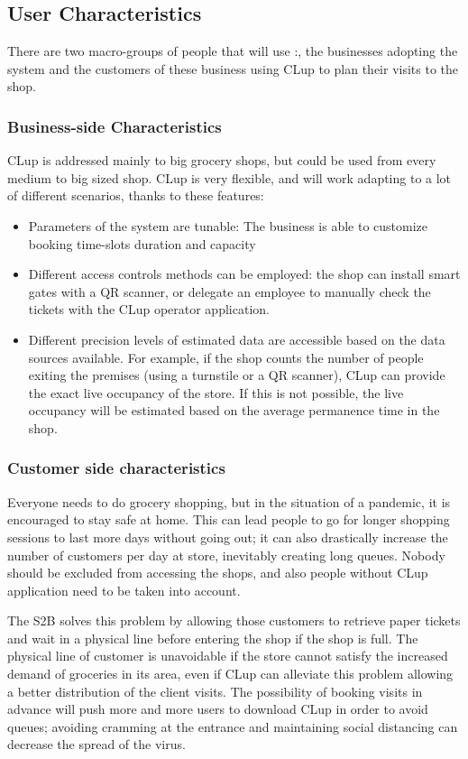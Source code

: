 \subsection{User Characteristics}
There are two macro-groups of people that will use :, the businesses adopting the system and the customers of these business using CLup to plan their visits to the shop.

\subsubsection{Business-side Characteristics}
CLup is addressed mainly to big grocery shops, but could be used from every medium to big sized shop.
CLup is very flexible, and will work adapting to a lot of different scenarios, thanks to these features:
\begin{itemize}
    \item Parameters of the system are tunable: The business is able to customize booking time-slots duration and capacity
    \item Different access controls methods can be employed: the shop can install smart gates with a QR scanner, or delegate an employee to manually check the tickets with the CLup operator application.
    \item Different precision levels of estimated data are accessible based on the data sources available. For example, if the shop counts the number of people exiting the premises (using a turnstile or a QR scanner), CLup can provide the exact live occupancy of the store. If this is not possible, the live occupancy will be estimated based on the average permanence time in the shop.

\end{itemize}
\subsubsection{Customer side characteristics}
Everyone needs to do grocery shopping, but in the situation of a pandemic, it is encouraged to stay safe at home. This can lead people to go for longer shopping sessions to last more days without going out; it can also drastically increase the number of customers per day at store, inevitably creating long queues.
Nobody should be excluded from accessing the shops, and also people without CLup application need to be taken into account.


The S2B solves this problem by allowing those customers to retrieve paper tickets and wait in a physical line before entering the shop if the shop is full.
The physical line of customer is unavoidable if the store cannot satisfy the increased demand of groceries in its area, even if CLup can alleviate this problem allowing a better distribution of the client visits. The possibility of booking visits in advance will push more and more users to download CLup in order to avoid queues; avoiding cramming at the entrance and maintaining social distancing can decrease the spread of the virus.

